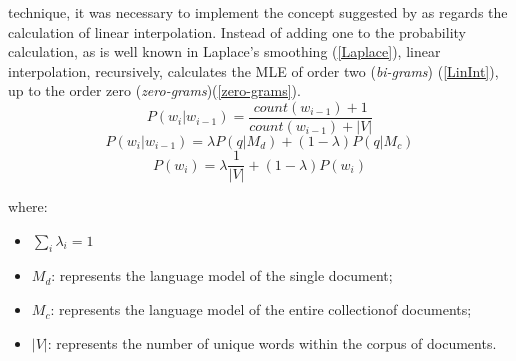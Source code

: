 technique, it was necessary to implement the concept suggested by \cite{11} as 
regards the calculation of linear interpolation. Instead of adding one to 
the probability calculation, as is well known in Laplace's smoothing (\ref{Laplace}), linear 
interpolation, recursively, calculates the MLE of order two (\emph{bi-grams}) (\ref{LinInt}), up to 
the order zero (\emph{zero-grams})(\ref{zero-grams}).
\begin{equation}\label{Laplace}
    P(w_i|w_{i-1}) = \frac{count(w_{i-1})+1}{count(w_{i-1})+|V|}
\end{equation}
\begin{equation}\label{LinInt}
    P(w_i|w_{i-1}) = \lambda P(q|M_d) + (1-\lambda)P(q|M_c)
\end{equation}
\begin{equation}\label{zero-grams}
    P(w_i) = \lambda \frac{1}{|V|} + (1-\lambda)P(w_i)
\end{equation}

where:
\begin{itemize}
    \item $\sum_i \lambda_i = 1$
    \item $M_d$: represents the language model of the single document;
    \item $M_c$: represents the language model of the entire collectionof documents;
    \item $|V|$: represents the number of unique words within the corpus of documents.
\end{itemize}


